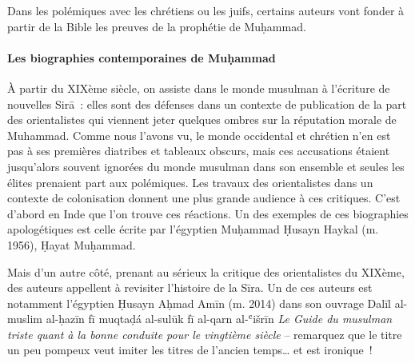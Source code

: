 Dans les polémiques avec les chrétiens ou les juifs, certains auteurs
vont fonder à partir de la Bible les preuves de la prophétie de
Muḥammad.


\paragraph{{Les biographies contemporaines de Muḥammad }}

À partir du XIXème siècle, on assiste dans le monde musulman à
l'écriture de nouvelles Sirā~: elles sont des défenses dans un contexte
de publication de la part des orientalistes qui viennent jeter quelques
ombres sur la réputation morale de Muhammad. Comme nous l'avons vu, le
monde occidental et chrétien n'en est pas à ses premières diatribes et
tableaux obscurs, mais ces accusations étaient jusqu'alors souvent
ignorées du monde musulman dans son ensemble et seules les élites
prenaient part aux polémiques. Les travaux des orientalistes dans un
contexte de colonisation donnent une plus grande audience à ces
critiques. C'est d'abord en Inde que l'on trouve ces réactions. Un des
exemples de ces biographies apologétiques est celle écrite par
l'égyptien Muḥammad Ḥusayn Haykal (m. 1956), Ḥayat Muḥammad.

Mais d'un autre côté, prenant au sérieux la critique des orientalistes
du XIXème, des auteurs appellent à revisiter l'histoire de la Sīra. Un
de ces auteurs est notamment l'égyptien Ḥusayn Aḥmad Amīn (m. 2014) dans
son ouvrage {Dalīl al-muslim al-ḥazīn fī muqtaḍá al-sulūk fī
al-qarn al-ʿišrīn} \textit{Le Guide du musulman triste quant à la bonne
conduite pour le vingtième siècle} -- remarquez que le titre un peu
pompeux veut imiter les titres de l'ancien temps\ldots{} et est
ironique~!

